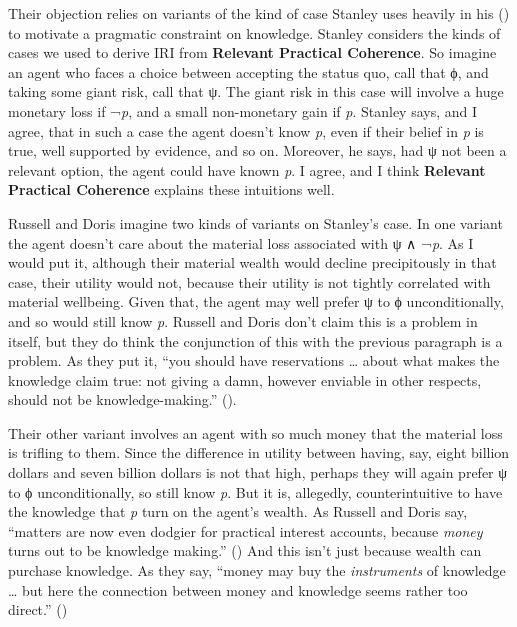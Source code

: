 \documentclass[
  11pt,
  letterpaper,
  DIV=11,
  numbers=noendperiod,
  twoside]{scrartcl}
\begin{document}
Their objection relies on variants of the kind of case Stanley uses
heavily in his () to motivate a
pragmatic constraint on knowledge. Stanley considers the kinds of cases
we used to derive IRI from \textbf{Relevant Practical Coherence}. So
imagine an agent who faces a choice between accepting the status quo,
call that ϕ, and taking some giant risk, call that ψ. The giant risk in
this case will involve a huge monetary loss if ¬\emph{p}, and a small
non-monetary gain if \emph{p}. Stanley says, and I agree, that in such a
case the agent doesn't know \emph{p}, even if their belief in \emph{p}
is true, well supported by evidence, and so on. Moreover, he says, had ψ
not been a relevant option, the agent could have known \emph{p}. I
agree, and I think \textbf{Relevant Practical Coherence} explains these
intuitions well.

Russell and Doris imagine two kinds of variants on Stanley's case. In
one variant the agent doesn't care about the material loss associated
with ψ ∧ ¬\emph{p}. As I would put it, although their material wealth
would decline precipitously in that case, their utility would not,
because their utility is not tightly correlated with material wellbeing.
Given that, the agent may well prefer ψ to ϕ unconditionally, and so
would still know \emph{p}. Russell and Doris don't claim this is a
problem in itself, but they do think the conjunction of this with the
previous paragraph is a problem. As they put it, ``you should have
reservations \ldots{} about what makes the knowledge claim true: not
giving a damn, however enviable in other respects, should not be
knowledge-making.'' ().

Their other variant involves an agent with so much money that the
material loss is trifling to them. Since the difference in utility
between having, say, eight billion dollars and seven billion dollars is
not that high, perhaps they will again prefer ψ to ϕ unconditionally, so
still know \emph{p}. But it is, allegedly, counterintuitive to have the
knowledge that \emph{p} turn on the agent's wealth. As Russell and Doris
say, ``matters are now even dodgier for practical interest accounts,
because \emph{money} turns out to be knowledge making.''
() And this
isn't just because wealth can purchase knowledge. As they say, ``money
may buy the \emph{instruments} of knowledge \ldots{} but here the
connection between money and knowledge seems rather too direct.''
()
\end{document}
